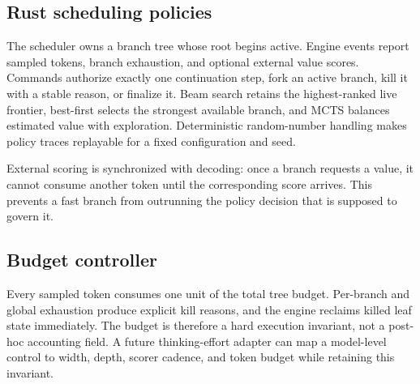 \subsection{Rust scheduling policies}

The scheduler owns a branch tree whose root begins active.  Engine events report
sampled tokens, branch exhaustion, and optional external value scores.  Commands
authorize exactly one continuation step, fork an active branch, kill it with a
stable reason, or finalize it.  Beam search retains the highest-ranked live
frontier, best-first selects the strongest available branch, and MCTS balances
estimated value with exploration.  Deterministic random-number handling makes
policy traces replayable for a fixed configuration and seed.

External scoring is synchronized with decoding: once a branch requests a value,
it cannot consume another token until the corresponding score arrives.  This
prevents a fast branch from outrunning the policy decision that is supposed to
govern it.

\subsection{Budget controller}

Every sampled token consumes one unit of the total tree budget.  Per-branch and
global exhaustion produce explicit kill reasons, and the engine reclaims killed
leaf state immediately.  The budget is therefore a hard execution invariant,
not a post-hoc accounting field.  A future thinking-effort adapter can map a
model-level control to width, depth, scorer cadence, and token budget while
retaining this invariant.
